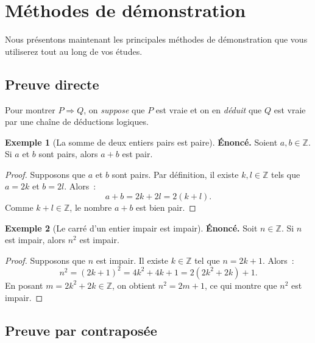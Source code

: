 \documentclass[12pt,a4paper,openany]{book}
\theoremstyle{definition}
\newtheorem{exemple}{Exemple}[chapter]
\newcommand{\Z}{\mathbb{Z}}
\begin{document}
\section{Méthodes de démonstration}
\label{sec:methodes-demo}

Nous présentons maintenant les principales méthodes de démonstration que vous utiliserez tout au long de vos études.

\subsection{Preuve directe}
\label{subsec:preuve-directe}

Pour montrer $P \Rightarrow Q$, on \emph{suppose} que $P$ est vraie et on en \emph{déduit} que $Q$ est vraie par une chaîne de déductions logiques.

\begin{exemple}[La somme de deux entiers pairs est paire]\label{ex:paire-somme}
  \textbf{Énoncé.} Soient $a, b \in \Z$. Si $a$ et $b$ sont pairs, alors $a + b$ est pair.

  \begin{proof}
    Supposons que $a$ et $b$ sont pairs. Par définition, il existe $k, l \in \Z$ tels que $a = 2k$ et $b = 2l$. Alors~:
    \[
      a + b = 2k + 2l = 2(k + l).
    \]
    Comme $k + l \in \Z$, le nombre $a + b$ est bien pair.
  \end{proof}
\end{exemple}

\begin{exemple}[Le carré d'un entier impair est impair]\label{ex:carre-impair}
  \textbf{Énoncé.} Soit $n \in \Z$. Si $n$ est impair, alors $n^2$ est impair.

  \begin{proof}
    Supposons que $n$ est impair. Il existe $k \in \Z$ tel que $n = 2k + 1$. Alors~:
    \[
      n^2 = (2k+1)^2 = 4k^2 + 4k + 1 = 2(2k^2 + 2k) + 1.
    \]
    En posant $m = 2k^2 + 2k \in \Z$, on obtient $n^2 = 2m + 1$, ce qui montre que $n^2$ est impair.
  \end{proof}
\end{exemple}

\subsection{Preuve par contraposée}
\label{subsec:contraposee}
\end{document}
